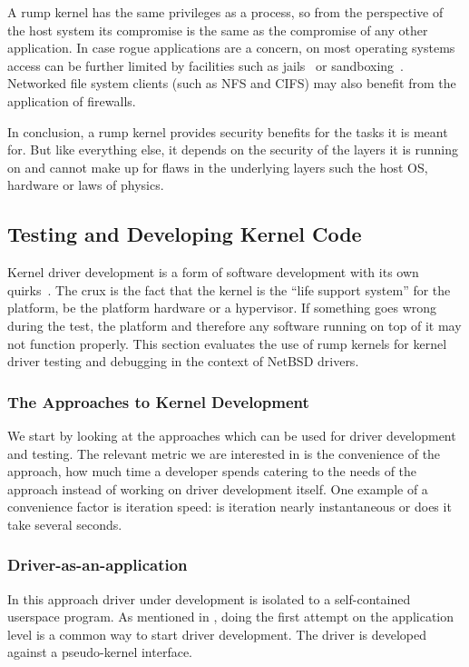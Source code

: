 A rump kernel has the same privileges as a process, so from the
perspective of the host system its compromise is the same as the
compromise of any other application.  In case rogue applications
are a concern, on most operating systems access can be
further limited by facilities such as jails~\cite{phk:jails} or
sandboxing~\cite{ford:vx32}.  Networked file system clients (such
as NFS and CIFS) may also benefit from the application of firewalls.

In conclusion, a rump kernel provides security benefits for the
tasks it is meant for.  But like everything else, it depends on
the security of the layers it is running on and cannot make up for
flaws in the underlying layers such the host OS, hardware or laws
of physics.

\subsection{Testing and Developing Kernel Code}
\label{sect:testing}

Kernel driver development is a form of software development with
its own quirks~\cite{lehey:debugging}.  The crux is the fact that
the kernel is the ``life support system'' for the platform, be the
platform hardware or a hypervisor.  If something goes wrong during
the test, the platform and therefore any software running on top
of it may not function properly.  This section evaluates the use
of rump kernels for kernel driver testing and debugging in the
context of NetBSD drivers.

\subsubsection{The Approaches to Kernel Development}

We start by looking at the approaches which can be used for driver
development and testing.  The relevant metric we are interested in
is the convenience of the approach, \ie how much time a developer
spends catering to the needs of the approach instead of working on
driver development itself.  One example of a convenience factor is
iteration speed: is iteration nearly instantaneous or does it take
several seconds.

\subsubsection*{Driver-as-an-application}

In this approach driver under development is isolated to a self-contained
userspace program.  As mentioned in , doing the
first attempt on the application level is a common way to start driver
development.  The driver is developed against a pseudo-kernel interface.

